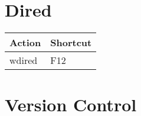 \documentclass[english]{rcalibrionecolumn}
\begin{document}
\section{Dired}
\label{sec-8}


\begin{center}
\begin{tabular}{ll}
 \textbf{Action}  &  \textbf{Shortcut}  \\
\hline
 wdired           &  F12                \\
\end{tabular}
\end{center}
\section{Version Control}
\label{sec-9}
\end{document}
